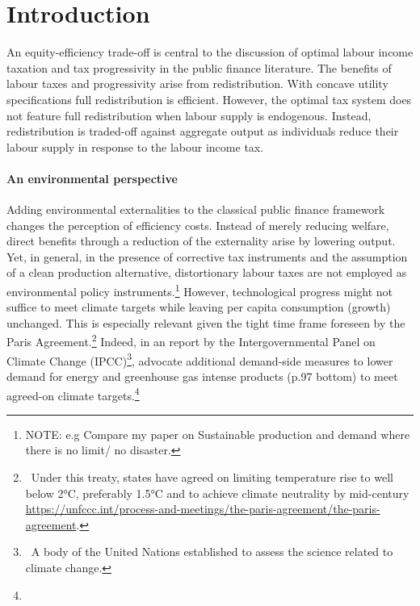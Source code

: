 
\section{Introduction}
An equity-efficiency trade-off is central to the discussion of optimal labour income taxation and tax progressivity in the public finance literature.  The benefits of labour taxes and progressivity arise from redistribution. With concave utility specifications full redistribution is efficient. However, the optimal tax system does not feature full redistribution when labour supply is endogenous. Instead, redistribution is traded-off against aggregate output as individuals reduce their labour supply in response to the labour income tax. 

\paragraph{An environmental perspective}

 Adding environmental externalities to the classical public finance framework changes the perception of efficiency costs. Instead of merely reducing welfare, direct benefits through a reduction of the externality arise by lowering output. 
Yet, in general, in the presence of corrective tax instruments and the assumption of a clean production alternative, %
distortionary labour taxes are not employed as environmental policy instruments.\footnote{ NOTE: e.g Compare my paper on Sustainable production and demand where there is no limit/ no disaster.} 
However, technological progress might not suffice to meet climate targets while leaving per capita consumption (growth) unchanged. This is especially relevant given the tight time frame foreseen by the Paris Agreement.\footnote{\ Under this treaty, states have agreed on limiting temperature rise to well below 2°C, preferably 1.5°C and to achieve climate neutrality by mid-century \url{https://unfccc.int/process-and-meetings/the-paris-agreement/the-paris-agreement}. } Indeed, in an report by the Intergovernmental Panel on Climate Change (IPCC)\footnote{\ A body of the United Nations established to assess the science related to climate change.},  \cite{Rogelj2018MitigationDevelopment.} advocate additional demand-side measures to lower demand for energy and greenhouse gas intense products (p.97 bottom) to meet agreed-on climate targets.\footnote{}

